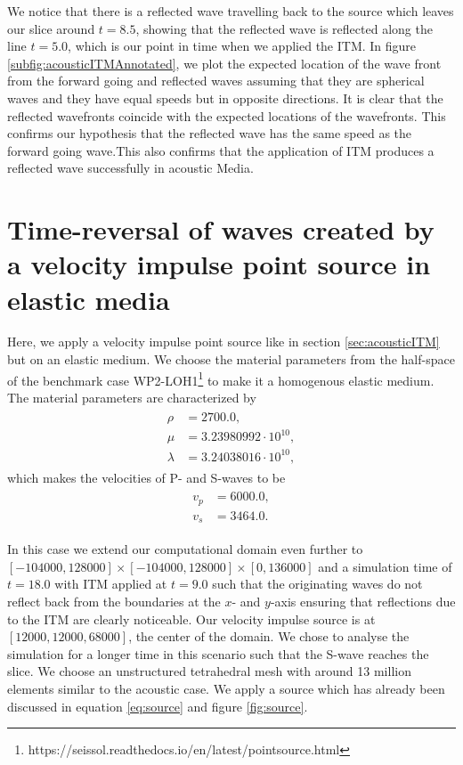 We notice that there is a reflected wave travelling back to the source which leaves our slice around $t=8.5$, showing that the reflected wave
is reflected along the line $t=5.0$, which is our point in time when we applied the \ac{ITM}. In figure \ref{subfig:acousticITMAnnotated}, we plot the expected
location of the wave front from the forward going and reflected waves assuming that they are spherical waves and they have equal speeds but in opposite directions. 
It is clear that the reflected wavefronts coincide with the expected locations of the wavefronts. This confirms our hypothesis that the reflected wave has the same speed
as the forward going wave.This also confirms that the application of \ac{ITM} produces a reflected wave successfully in acoustic Media.

\section{Time-reversal of waves created by a velocity impulse point source in elastic media} \label{sec:elasticITM}
Here, we apply a velocity impulse point source like in section \ref{sec:acousticITM} but on an elastic medium. We choose the material parameters from the half-space of the 
benchmark case WP2-LOH1\footnote[1]{https://seissol.readthedocs.io/en/latest/pointsource.html} to make it a homogenous elastic medium. The material parameters 
are characterized by
\begin{align}
    \begin{split}
        \rho &=    2700.0 ,\\
        \mu &=     3.23980992 \cdot 10^{10} ,\\
        \lambda &= 3.24038016 \cdot 10^{10} ,
    \end{split}
\end{align}
which makes the velocities of P- and S-waves to be
\begin{align}
    \begin{split}
        v_p &= 6000.0 ,\\
        v_s &= 3464.0 .
    \end{split}
\end{align}

In this case we extend our computational domain even further to $\left[-104000,128000\right] \times \left[-104000,128000\right] \times \left[0,136000\right]$ and a simulation time of $t=18.0$ with \ac{ITM} applied at $t=9.0$
such that the originating waves do not reflect back from the boundaries at the $x$- and $y$-axis ensuring that reflections due to the \ac{ITM} are clearly noticeable.
Our velocity impulse source is at $\left[12000,12000,68000\right]$, the center of the domain.
We chose to analyse the simulation for a longer time in this scenario such that the S-wave reaches the slice. We choose an unstructured tetrahedral mesh with around 13 million elements similar to the acoustic case. 
We apply a source which has already been discussed in equation \ref{eq:source} and figure \ref{fig:source}.

